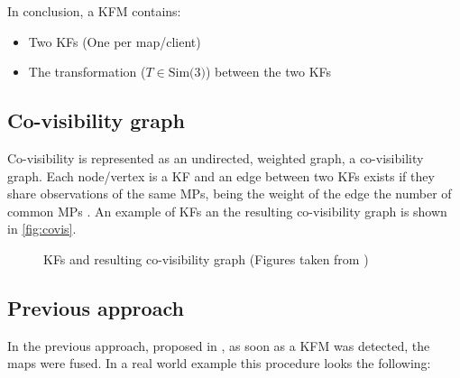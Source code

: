 In conclusion, a \ac{KFM} contains:
\begin{itemize}
  \item Two \acp{KF} (One per map/client)
  \item The transformation ($T \in \text{Sim(3)}$) between the two \acp{KF}
\end{itemize}

\subsection{Co-visibility graph}
Co-visibility is represented as an undirected, weighted graph, a co-visibility graph. Each node/vertex is a \ac{KF} and an edge between two \acp{KF} exists if they share observations of the same \acp{MP}, being the weight of the edge the number of common \acp{MP} \cite{Mur-Artal2015}. An example of \acp{KF} an the resulting co-visibility graph is shown in \autoref{fig:covis}.

\begin{figure}[H]
	\centering
	\quad
	\caption{\acp{KF} and resulting co-visibility graph (Figures taken from \cite{Mur-Artal2015})}
	\label{fig:covis}
\end{figure}

\subsection{Previous approach}
In the previous approach, proposed in \cite{Schmuck2017}, as soon as a \ac{KFM} was detected, the maps were fused. In a real world example this procedure looks the following:

